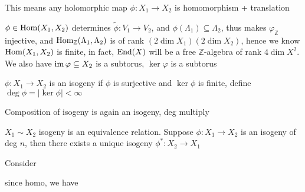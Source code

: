 This means any holomorphic map $\phi:X_1\to X_2$ is homomorphism + translation
\begin{center}
\end{center}
$\phi\in\operatorname{Hom}(X_1,X_2)$ determines $\tilde\phi:V_1\to V_2$, and $\phi(\Lambda_1)\subseteq\Lambda_2$, thus makes $\varphi_{\mathbb Z}$ injective, and $\operatorname{Hom}_{\mathbb Z}(\Lambda_1,\Lambda_2)$ is of rank $(2\dim X_1)(2\dim X_2)$, hence we know $\operatorname{Hom}(X_1,X_2)$ is finite, in fact, $\operatorname{End}(X)$ will be a free $\mathbb Z$-algebra of rank $4\dim X^2$. We also have $\operatorname{im}\varphi\subseteq X_2$ is a subtorus, $\ker\varphi$ is a subtorus

\begin{definition}
$\phi:X_1\to X_2$ is an isogeny if $\phi$ is surjective and $\ker\phi$ is finite, define $\deg\phi=|\ker\phi|<\infty$
\end{definition}

Composition of isogeny is again an isogeny, deg multiply

$X_1\sim X_2$ isogeny is an equivalence relation. Suppose $\phi:X_1\to X_2$ is an isogeny of deg $n$, then there exists a unique isogeny $\phi^*:X_2\to X_1$

Consider

\begin{center}
\end{center}

since homo, we have
\begin{center}
\end{center}

